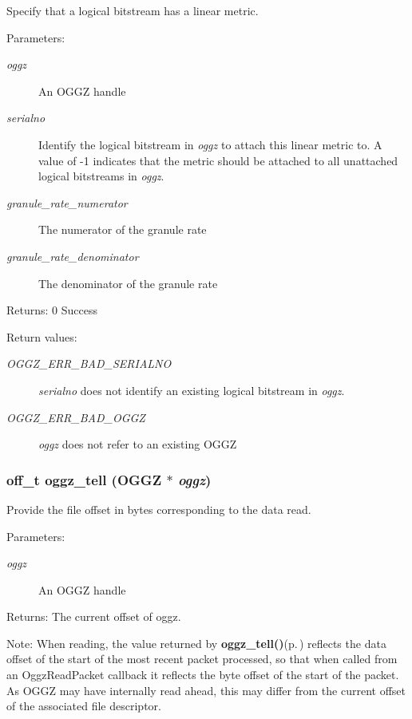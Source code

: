 Specify that a logical bitstream has a linear metric. 

\begin{Desc}
\item[Parameters:]
\begin{description}
\item[{\em oggz}]An OGGZ handle \item[{\em serialno}]Identify the logical bitstream in {\em oggz\/} to attach this linear metric to. A value of -1 indicates that the metric should be attached to all unattached logical bitstreams in {\em oggz\/}. \item[{\em granule\_\-rate\_\-numerator}]The numerator of the granule rate \item[{\em granule\_\-rate\_\-denominator}]The denominator of the granule rate \end{description}
\end{Desc}
\begin{Desc}
\item[Returns:]0 Success \end{Desc}
\begin{Desc}
\item[Return values:]
\begin{description}
\item[{\em OGGZ\_\-ERR\_\-BAD\_\-SERIALNO}]{\em serialno\/} does not identify an existing logical bitstream in {\em oggz\/}. \item[{\em OGGZ\_\-ERR\_\-BAD\_\-OGGZ}]{\em oggz\/} does not refer to an existing OGGZ \end{description}
\end{Desc}
\subsubsection{\setlength{\rightskip}{0pt plus 5cm}off\_\-t oggz\_\-tell ({\bf OGGZ} $\ast$ {\em oggz})}\label{group__seeking__group_a5}


Provide the file offset in bytes corresponding to the data read. 

\begin{Desc}
\item[Parameters:]
\begin{description}
\item[{\em oggz}]An OGGZ handle \end{description}
\end{Desc}
\begin{Desc}
\item[Returns:]The current offset of oggz.\end{Desc}
\begin{Desc}
\item[Note:]When reading, the value returned by {\bf oggz\_\-tell()}{\rm (p.\,\pageref{group__seeking__group_a5})} reflects the data offset of the start of the most recent packet processed, so that when called from an Oggz\-Read\-Packet callback it reflects the byte offset of the start of the packet. As OGGZ may have internally read ahead, this may differ from the current offset of the associated file descriptor. \end{Desc}
